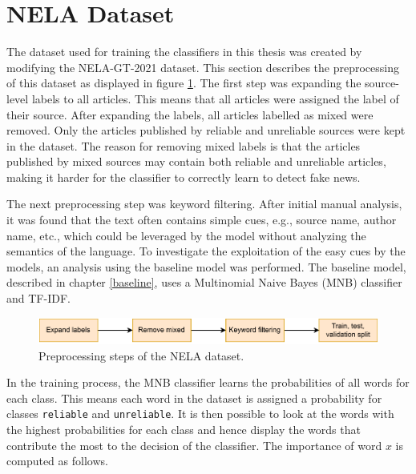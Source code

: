 \section{NELA Dataset}
\label{nela-my}
The dataset used for training the classifiers in this thesis was created by modifying the NELA-GT-2021 dataset. This section describes the preprocessing of this dataset as displayed in figure \ref{fig:nela_prepproc}. The first step was expanding the source-level labels to all articles. This means that all articles were assigned the label of their source. After expanding the labels, all articles labelled as mixed were removed. Only the articles published by reliable and unreliable sources were kept in the dataset. The reason for removing mixed labels is that the articles published by mixed sources may contain both reliable and unreliable articles, making it harder for the classifier to correctly learn to detect fake news. 

The next preprocessing step was keyword filtering. After initial manual analysis, it was found that the text often contains simple cues, e.g., source name, author name, etc., which could be leveraged by the model without analyzing the semantics of the language. To investigate the exploitation of the easy cues by the models, an analysis using the baseline model was performed. The baseline model, described in chapter \ref{baseline}, uses a Multinomial Naive Bayes (MNB) classifier and TF-IDF.

\begin{figure}[H]
    \centering
    \includegraphics[scale=1]{obrazky-figures/nela_preproc.pdf}
    \caption{Preprocessing steps of the NELA dataset.}
    \label{fig:nela_prepproc}
\end{figure}

In the training process, the MNB classifier learns the probabilities of all words for each class. This means each word in the dataset is assigned a probability for classes \texttt{reliable} and \texttt{unreliable}. It is then possible to look at the words with the highest probabilities for each class and hence display the words that contribute the most to the decision of the classifier. The importance of word $x$ is computed as follows.

